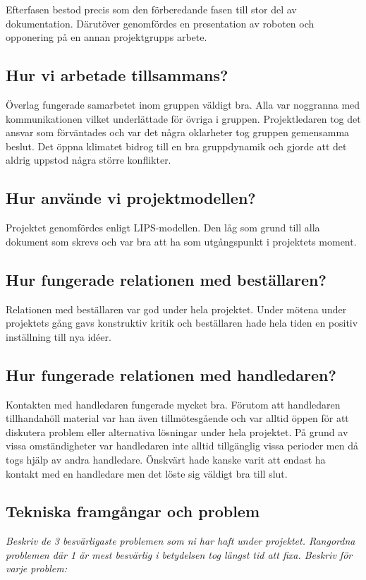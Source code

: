 \documentclass[11pt]{article}
\begin{document}
Efterfasen bestod precis som den förberedande fasen till stor del av dokumentation. Därutöver genomfördes en presentation av roboten och opponering på en annan projektgrupps arbete.

\subsection{Hur vi arbetade tillsammans?}
Överlag fungerade samarbetet inom gruppen väldigt bra. Alla var noggranna med kommunikationen vilket underlättade för övriga i gruppen. Projektledaren tog det ansvar som förväntades och var det några oklarheter tog gruppen gemensamma beslut. Det öppna klimatet bidrog till en bra gruppdynamik och gjorde att det aldrig uppstod några större konflikter.

\subsection{Hur använde vi projektmodellen?} 
Projektet genomfördes enligt LIPS-modellen. Den låg som grund till alla dokument som skrevs och var bra att ha som utgångspunkt i projektets moment. 

\subsection{Hur fungerade relationen med beställaren?}
Relationen med beställaren var god under hela projektet. Under mötena under projektets gång gavs konstruktiv kritik och beställaren hade hela tiden en positiv inställning till nya idéer. 

\subsection{Hur fungerade relationen med handledaren?}
Kontakten med handledaren fungerade mycket bra. Förutom att handledaren tillhandahöll material var han även  tillmötesgående och var alltid öppen för att diskutera problem eller alternativa lösningar under hela projektet. På grund av vissa omständigheter var handledaren inte alltid tillgänglig vissa perioder men då togs hjälp av andra handledare. Önskvärt hade kanske varit att endast ha kontakt med en handledare men det löste sig väldigt bra till slut.

\subsection{Tekniska framgångar och problem}
\textit{Beskriv de 3 besvärligaste problemen som ni har haft under projektet. Rangordna problemen där 1 är mest besvärlig i betydelsen tog längst tid att fixa. Beskriv för varje problem: }
\end{document}
